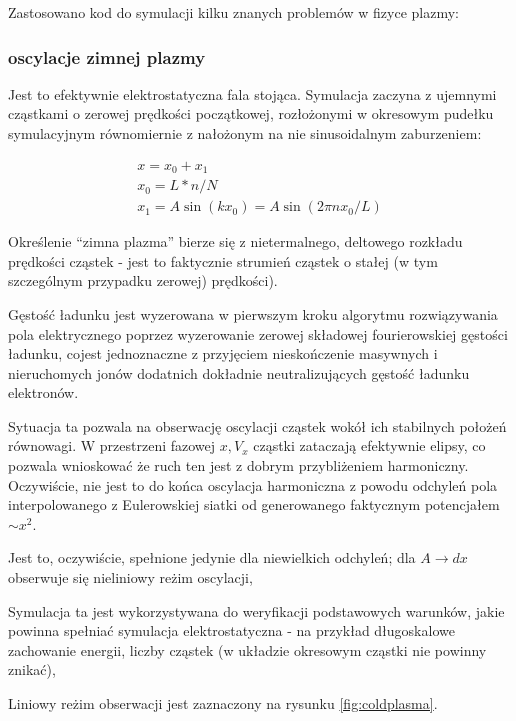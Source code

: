     Zastosowano kod do symulacji kilku znanych problemów w fizyce plazmy:
    \subsubsection{oscylacje zimnej plazmy}
    Jest to efektywnie elektrostatyczna fala stojąca. Symulacja zaczyna z ujemnymi cząstkami
o zerowej prędkości początkowej, rozłożonymi w okresowym pudełku symulacyjnym
równomiernie z nałożonym na nie sinusoidalnym zaburzeniem:

\begin{align}
x = x_0 + x_1\\
x_0 = L * n / N\\
x_1 = A  \sin(k x_0)=A \sin(2 \pi n x_0 / L)
\end{align}

Określenie ``zimna plazma'' bierze się z nietermalnego, deltowego
rozkładu prędkości cząstek - jest to faktycznie strumień cząstek o stałej
(w tym szczególnym przypadku zerowej) prędkości).

Gęstość ładunku jest wyzerowana w pierwszym kroku algorytmu rozwiązywania pola elektrycznego
poprzez wyzerowanie zerowej składowej fourierowskiej gęstości ładunku, cojest jednoznaczne
z przyjęciem nieskończenie masywnych i nieruchomych jonów dodatnich dokładnie neutralizujących gęstość
ładunku elektronów.

Sytuacja ta
pozwala na obserwację oscylacji cząstek wokół ich stabilnych położeń
równowagi. W przestrzeni fazowej $x, V_x$ cząstki zataczają efektywnie
elipsy, co pozwala wnioskować że ruch ten jest z dobrym przybliżeniem harmoniczny.
Oczywiście, nie jest to do końca oscylacja harmoniczna z powodu odchyleń pola interpolowanego
z Eulerowskiej siatki od generowanego faktycznym potencjałem $ \sim x^2 $.

Jest to, oczywiście, spełnione jedynie dla niewielkich odchyleń; dla $A \to
dx$  obserwuje się nieliniowy reżim oscylacji, %


Symulacja ta jest wykorzystywana do weryfikacji podstawowych warunków, jakie powinna spełniać
symulacja elektrostatyczna - na przykład długoskalowe zachowanie energii, liczby cząstek (w układzie okresowym cząstki nie powinny
znikać), %

Liniowy reżim obserwacji jest zaznaczony na rysunku \ref{fig:coldplasma}.

